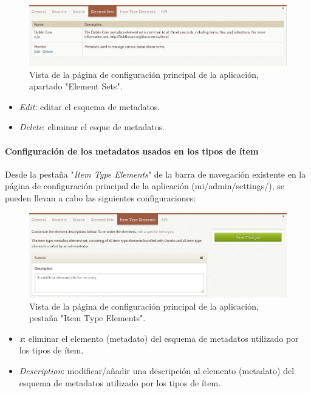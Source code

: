 \documentclass[
]{article}
\providecommand{\tightlist}{%
  \setlength{\itemsep}{0pt}\setlength{\parskip}{0pt}}
\begin{document}
\begin{figure}
\hypertarget{settings-es}{%
\centering
\includegraphics{../_static/images/settings-es.png}
\caption{Vista de la página de configuración principal de la aplicación,
apartado "Element Sets".}\label{settings-es}
}
\end{figure}

\begin{itemize}
\tightlist
\item
  \emph{Edit}: editar el esquema de metadatos.
\item
  \emph{Delete}: eliminar el esque de metadatos.
\end{itemize}

\hypertarget{configuraciuxf3n-de-los-metadatos-usados-en-los-tipos-de-uxedtem}{%
\paragraph{Configuración de los metadatos usados en los tipos de
ítem}\label{configuraciuxf3n-de-los-metadatos-usados-en-los-tipos-de-uxedtem}}

Desde la pestaña "\emph{Item Type Elements}" de la barra de navegación
existente en la página de configuración principal de la aplicación
({mi/admin/settings/}), se pueden llevan a cabo las siguientes
configuraciones:

\begin{figure}
\hypertarget{settings-it}{%
\centering
\includegraphics{../_static/images/settings-it.png}
\caption{Vista de la página de configuración principal de la aplicación,
pestaña "Item Type Elements".}\label{settings-it}
}
\end{figure}

\begin{itemize}
\tightlist
\item
  \emph{x}: eliminar el elemento (metadato) del esquema de metadatos
  utilizado por los tipos de ítem.
\item
  \emph{Description}: modificar/añadir una descripción al elemento
  (metadato) del esquema de metadatos utilizado por los tipos de ítem.
\end{itemize}
\end{document}
